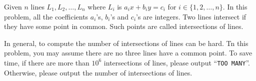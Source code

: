 Given $n$ lines $L_1,L_2,\ldots,L_n$ where 
$L_i$ is $a_ix+b_iy=c_i$ for $i\in \{1,2,\dots,n\}$.
In this problem, all the coefficients $a_i$'s, $b_i$'s and $c_i$'s are integers.
Two lines intersect if they have some point in common. 
Such points are called intersections of lines.

In general, to compute the number of intersections of lines can be hard.
Tn this problem, you may assume there are no three lines have a common point.
To save time, if there are more than $10^6$ intersections of lines,
please output ``\verb+TOO MANY+''.
Otherwise, please output the number of intersections of lines.
